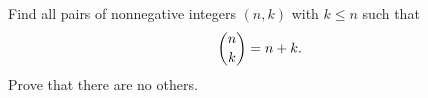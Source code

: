 Find all pairs of nonnegative integers $(n,k)$ with $k\le n$ such that
\[
\dbinom nk=n+k .
\]
Prove that there are no others.

